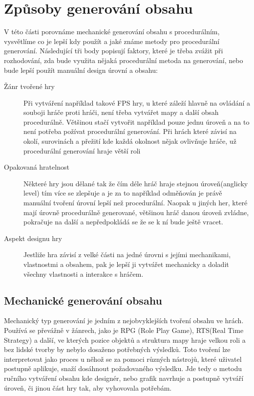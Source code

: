 \section{Způsoby generování obsahu}
V této části porovnáme mechanické generování obsahu s procedurálním, vysvětlíme co je lepší kdy použít a jaké známe metody pro procedurální generování. Následující tři body popisují faktory, které je třeba zvážit při rozhodování, zda bude využita nějaká procedurální metoda na generování, nebo bude lepší použít manuální design úrovní a obsahu:
\begin{description}
	\item[Žánr tvořené hry] Při vytváření například takové FPS hry, u které záleží hlavně na ovládání a souboji hráče proti hráči, není třeba vytvářet mapy a další obsah procedurálně. Většinou stačí vytvořit například pouze jednu úroveň a na to není potřeba požívat procedurální generování. Při hrách které závisí na okolí, surovinách a přežití kde každá okolnost nějak ovlivňuje hráče, už procedurální generování hraje větší roli
	\item[Opakovaná hratelnost] Některé hry jsou dělané tak že čím déle hráč hraje stejnou úroveň(anglicky level) tím více se zlepšuje a je za to například odměňován je právě manuální tvoření úrovní lepší než procedurální. Naopak u jiných her, které mají úrovně procedurálně generované, většinou hráč danou úroveň zvládne, pokračuje na další a nepředpokládá se že se k ní bude ještě vracet.
	\item[Aspekt designu hry] Jestliže hra závisí z velké části na jedné úrovni s jejími mechanikami, vlastnostmi a obsahem, pak je lepší ji vytvářet mechanicky a doladit všechny vlastnosti a interakce s hráčem.
\end{description}


\subsection{Mechanické generování obsahu}
\label{traditional}
Mechanický typ generování je jedním z nejobvyklejších tvoření obsahu ve hrách. Používá se převážně v žánrech, jako je RPG (Role Play Game), RTS(Real Time Strategy) a další, ve kterých pozice objektů a struktura mapy hraje velkou roli a bez lidské tvorby by nebylo dosaženo potřebných výsledků. Toto tvoření lze interpretovat jako proces u něhož se za pomoci různých nástrojů, které uživatel postupně aplikuje, snaží dosáhnout požadovaného výsledku. Jde tedy o metodu ručního vytváření obsahu kde designér, nebo grafik navrhuje a postupně vytváří úroveň, či jinou část hry tak, aby vyhovovala potřebám.
	
